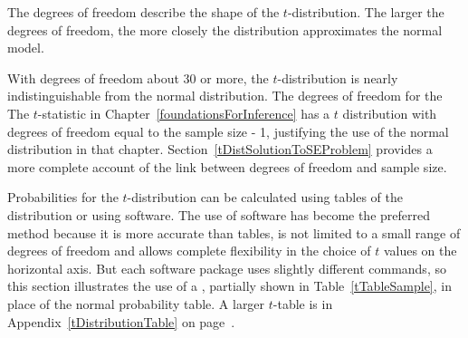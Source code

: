 \begin{termBox}{
The degrees of freedom describe the shape of the $t$-distribution. The larger the degrees of freedom, the more closely the distribution approximates the normal model.}
\end{termBox}

With degrees of freedom about 30 or more, the $t$-distribution is nearly indistinguishable from the normal distribution. The degrees of freedom for the The $t$-statistic in Chapter~\ref{foundationsForInference} has a $t$ distribution with degrees of freedom equal to the sample size - 1, justifying the use of the normal distribution in that chapter.  Section~\ref{tDistSolutionToSEProblem} provides a more complete account of the link between degrees of freedom and sample size.

Probabilities for the $t$-distribution can be calculated using tables of the distribution or using software.  The use of software has become the preferred method because it is more accurate than tables, is not limited to a small range of degrees of freedom and allows complete flexibility in the choice of $t$ values on the horizontal axis.  But each software package uses slightly different commands, so this section illustrates the use of a , partially shown in Table~\ref{tTableSample}, in place of the normal probability table. A larger $t$-table is in Appendix~\ref{tDistributionTable} on page~\pageref{tDistributionTable}.

